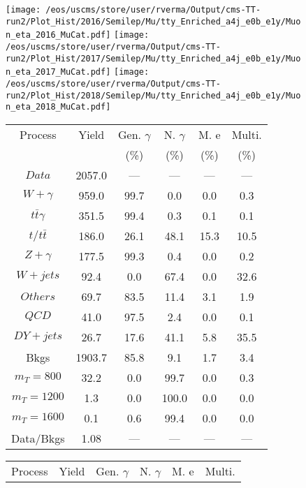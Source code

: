 \begin{figure}
\centering
\texttt{[image: /eos/uscms/store/user/rverma/Output/cms-TT-run2/Plot\_Hist/2016/Semilep/Mu/tty\_Enriched\_a4j\_e0b\_e1y/Muon\_eta\_2016\_MuCat.pdf]}
\texttt{[image: /eos/uscms/store/user/rverma/Output/cms-TT-run2/Plot\_Hist/2017/Semilep/Mu/tty\_Enriched\_a4j\_e0b\_e1y/Muon\_eta\_2017\_MuCat.pdf]}
\texttt{[image: /eos/uscms/store/user/rverma/Output/cms-TT-run2/Plot\_Hist/2018/Semilep/Mu/tty\_Enriched\_a4j\_e0b\_e1y/Muon\_eta\_2018\_MuCat.pdf]}
\begin{minipage}[c]{0.32\textwidth}
\centering
\tiny{
\begin{tabular}{cccccc}
\hline
Process & Yield & Gen. $\gamma$ & N. $\gamma$ & M. e & Multi. \\
 &  & (\%) & (\%) & (\%) & (\%)  \\
\hline
                                                                      $ Data $ &  2057.0 &  --- &  --- &  --- &  ---\\
$ W+\gamma $ &  959.0 &  99.7 &  0.0 &  0.0 &  0.3\\
$ t\bar{t}\gamma $ &  351.5 &  99.4 &  0.3 &  0.1 &  0.1\\
$ t/t\bar{t} $ &  186.0 &  26.1 &  48.1 &  15.3 &  10.5\\
$ Z+\gamma $ &  177.5 &  99.3 &  0.4 &  0.0 &  0.2\\
$ W+jets $ &  92.4 &  0.0 &  67.4 &  0.0 &  32.6\\
$ Others $ &  69.7 &  83.5 &  11.4 &  3.1 &  1.9\\
$ QCD $ &  41.0 &  97.5 &  2.4 &  0.0 &  0.1\\
$ DY+jets $ &  26.7 &  17.6 &  41.1 &  5.8 &  35.5\\
Bkgs &  1903.7 &  85.8 &  9.1 &  1.7 &  3.4\\
$ m_{T} = 800 $ &  32.2 &  0.0 &  99.7 &  0.0 &  0.3\\
$ m_{T} = 1200 $ &  1.3 &  0.0 &  100.0 &  0.0 &  0.0\\
$ m_{T} = 1600 $ &  0.1 &  0.6 &  99.4 &  0.0 &  0.0\\
Data/Bkgs &  1.08 &  --- &  --- &  --- &  ---\\
\hline
\end{tabular}
}
\end{minipage}
\begin{minipage}[c]{0.32\textwidth}
\centering
\tiny{
\begin{tabular}{cccccc}
\hline
Process & Yield & Gen. $\gamma$ & N. $\gamma$ & M. e & Multi. \\

\end{tabular}}
\end{minipage}
\end{figure}
